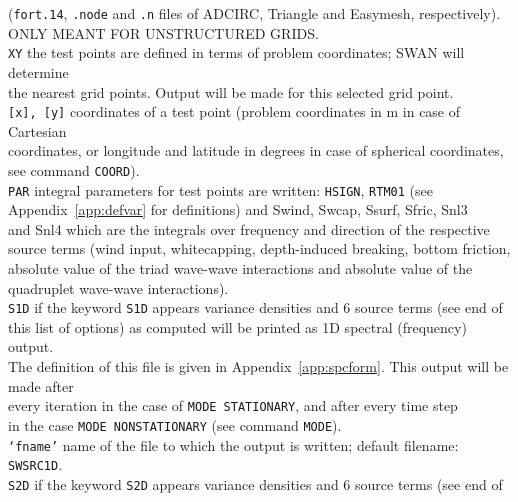 \documentclass[12pt]{book}
\begin{document}
\begin{tabbing}
                  ({\tt fort.14}, {\tt .node} and {\tt.n} files of ADCIRC, Triangle and Easymesh, respectively).\\
                  ONLY MEANT FOR UNSTRUCTURED GRIDS.\-\\
{\tt XY}       \> the test points are defined in terms of problem coordinates; SWAN will determine\+\\
                  the nearest grid points. Output will be made for this selected grid point.\-\\
{\tt [x], [y]} \> coordinates of a test point (problem coordinates in m in case of Cartesian\+\\
                  coordinates, or longitude and latitude in degrees in case of spherical coordinates,\\
                  see command {\tt COORD}).\-\\
{\tt PAR}      \> integral parameters for test points are written: {\tt HSIGN}, {\tt RTM01} (see\+\\
                  Appendix~\ref{app:defvar} for definitions) and Swind, Swcap, Ssurf, Sfric, Snl3\\
                  and Snl4 which are the integrals over frequency and direction of the respective\\
                  source terms (wind input, whitecapping, depth-induced breaking, bottom friction,\\
                  absolute value of the triad wave-wave interactions and absolute value of the\\
                  quadruplet wave-wave interactions).\-\\
{\tt S1D}      \> if the keyword {\tt S1D} appears variance densities and 6 source terms (see end of\+\\
                  this list of options) as computed will be printed as 1D spectral (frequency) output.\\
                  The definition of this file is given in Appendix~\ref{app:spcform}. This output will be made after\\
                  every iteration in the case of {\tt MODE STATIONARY}, and after every time step\\
                  in the case {\tt MODE NONSTATIONARY} (see command {\tt MODE}).\-\\
{\tt `fname'}  \> name of the file to which the output is written; default filename: {\tt SWSRC1D}.\\
{\tt S2D}      \> if the keyword {\tt S2D} appears variance densities and 6 source terms (see end of\+\\

\end{tabbing}
\end{document}

